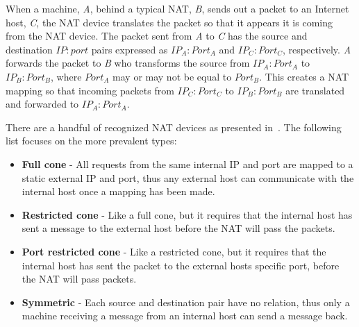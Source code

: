 \documentclass[conference]{IEEEtran}
\begin{document}
When a machine, \textit{A}, behind a typical NAT, \textit{B}, sends out a
packet to an Internet host, \textit{C}, the NAT device translates the packet so
that it appears it is coming from the NAT device.  The packet sent from
\textit{A} to \textit{C} has the source and destination $IP:port$ pairs
expressed as $IP_A:Port_A$ and $IP_C:Port_C$, respectively.  \textit{A}
forwards the packet to \textit{B} who transforms the source from $IP_A:Port_A$
to $IP_B:Port_B$, where $Port_A$ may or may not be equal to $Port_B$.  This
creates a NAT mapping so that incoming packets from $IP_C:Port_C$ to
$IP_B:Port_B$ are translated and forwarded to $IP_A:Port_A$.

There are a handful of recognized NAT devices as presented in~\cite{stun,
p2p_nats_rfc}.  The following list focuses on the more prevalent types:
\begin{itemize}
\item \textbf{Full cone} - All requests from the same internal IP and port are
mapped to a static external IP and port, thus any external host can communicate
with the internal host once a mapping has been made.
\item \textbf{Restricted cone} - Like a full cone, but it requires that the
internal host has sent a message to the external host before the NAT will pass
the packets.
\item \textbf{Port restricted cone} - Like a restricted cone, but it requires
that the internal host has sent the packet to the external hosts specific port,
before the NAT will pass packets.
\item \textbf{Symmetric} - Each source and destination pair have no relation,
thus only a machine receiving a message from an internal host can send a
message back.
\end{itemize}
\end{document}
